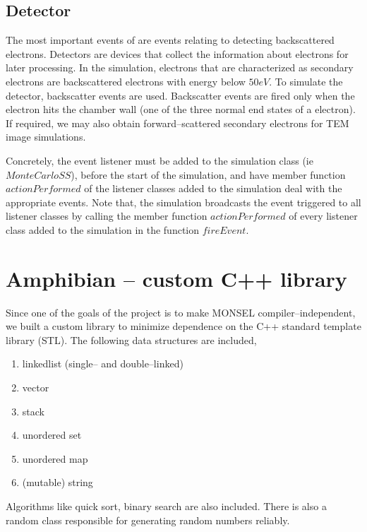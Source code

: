 \subsection{Detector}\label{subsec:detector}
The most important events of are events relating to detecting backscattered electrons. Detectors are devices that collect the information about electrons for later processing. In the simulation, electrons that are characterized as secondary electrons are backscattered electrons with energy below $50 eV$. To simulate the detector, backscatter events are used. Backscatter events are fired only when the electron hits the chamber wall (one of the three normal end states of a electron). If required, we may also obtain forward--scattered secondary electrons for TEM image simulations.

Concretely, the event listener must be added to the simulation class (ie $MonteCarloSS$), before the start of the simulation, and have member function $actionPerformed$ of the listener classes added to the simulation deal with the appropriate events. Note that, the simulation broadcasts the event triggered to all listener classes by calling the member function $actionPerformed$ of every listener class added to the simulation in the function $fireEvent$.

\section{Amphibian -- custom C++ library}
Since one of the goals of the project is to make MONSEL compiler--independent, we built a custom library to minimize dependence on the C++ standard template library (STL). The following data structures are included,
\begin{enumerate}
\item linkedlist (single-- and double--linked)
\item vector
\item stack
\item unordered set
\item unordered map
\item (mutable) string
\end{enumerate}

Algorithms like quick sort, binary search are also included. There is also a random class responsible for generating random numbers reliably.

